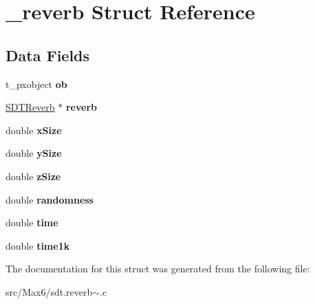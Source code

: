 \hypertarget{struct__reverb}{}\section{\+\_\+reverb Struct Reference}
\label{struct__reverb}
\subsection*{Data Fields}
\begin{DoxyCompactItemize}
\item 
\hypertarget{struct__reverb_a55b4380edb216f04a1c42b9095594963}{}t\+\_\+pxobject {\bfseries ob}\label{struct__reverb_a55b4380edb216f04a1c42b9095594963}

\item 
\hypertarget{struct__reverb_a1122641a43416014e38bb6bb3a642609}{}\hyperlink{struct_s_d_t_reverb}{S\+D\+T\+Reverb} $\ast$ {\bfseries reverb}\label{struct__reverb_a1122641a43416014e38bb6bb3a642609}

\item 
\hypertarget{struct__reverb_a176c5c9128af596b5f7a5d40767464ea}{}double {\bfseries x\+Size}\label{struct__reverb_a176c5c9128af596b5f7a5d40767464ea}

\item 
\hypertarget{struct__reverb_a787b0eeacea266cc9c28b5cba52e83a4}{}double {\bfseries y\+Size}\label{struct__reverb_a787b0eeacea266cc9c28b5cba52e83a4}

\item 
\hypertarget{struct__reverb_ac4f3f1c0f5ce6443b48e2a7ae6bfc19e}{}double {\bfseries z\+Size}\label{struct__reverb_ac4f3f1c0f5ce6443b48e2a7ae6bfc19e}

\item 
\hypertarget{struct__reverb_a5f3b66dbd20777fc167adda1721841c8}{}double {\bfseries randomness}\label{struct__reverb_a5f3b66dbd20777fc167adda1721841c8}

\item 
\hypertarget{struct__reverb_ab2d5aa7fce1a14d8bddfb2c333ea9679}{}double {\bfseries time}\label{struct__reverb_ab2d5aa7fce1a14d8bddfb2c333ea9679}

\item 
\hypertarget{struct__reverb_ab9d17ebb75adbfb1b217b5308f08110b}{}double {\bfseries time1k}\label{struct__reverb_ab9d17ebb75adbfb1b217b5308f08110b}

\end{DoxyCompactItemize}


The documentation for this struct was generated from the following file\+:\begin{DoxyCompactItemize}
\item 
src/\+Max6/sdt.\+reverb$\sim$.\+c\end{DoxyCompactItemize}
